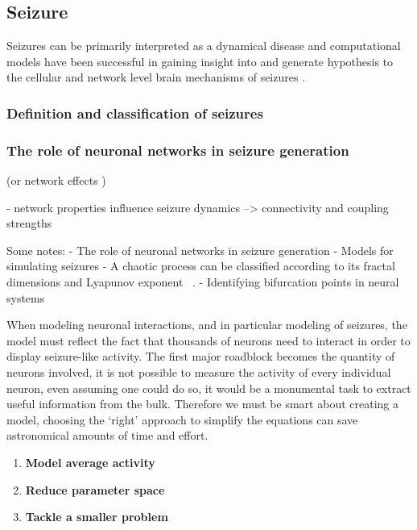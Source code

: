 





\subsection*{Seizure}
Seizures can be primarily interpreted as a dynamical disease \cite{da2003epilepsies, milton2010epilepsy} and computational models have been successful in gaining insight into and generate hypothesis to the cellular and network level brain mechanisms of seizures \cite{bazhenov2008cellular}.

\subsubsection*{Definition and classification of seizures}



\subsubsection{The role of neuronal networks in seizure generation}
(or network effects )

- network properties influence seizure dynamics --> connectivity and coupling strengths


Some notes:
- The role of neuronal networks in seizure generation
- Models for simulating seizures
- A chaotic process can be classified according to its fractal dimensions and Lyapunov exponent ~\cite{du2013neural}.
- Identifying bifurcation points in neural systems 



When modeling neuronal interactions, and in particular modeling of seizures, the model must reflect the fact that thousands of neurons need to interact in order to display seizure-like activity. 
The first major roadblock becomes the quantity of neurons involved, it is not possible to measure the activity of every individual neuron, even assuming one could do so, it would be a monumental task to extract useful information from the bulk. 
Therefore we must be smart about creating a model, choosing the `right' approach to simplify the equations can save astronomical amounts of time and effort.
\begin{enumerate}
    \item \textbf{Model average activity}
    \item \textbf{Reduce parameter space}
    \item \textbf{Tackle a smaller problem}
\end{enumerate}


